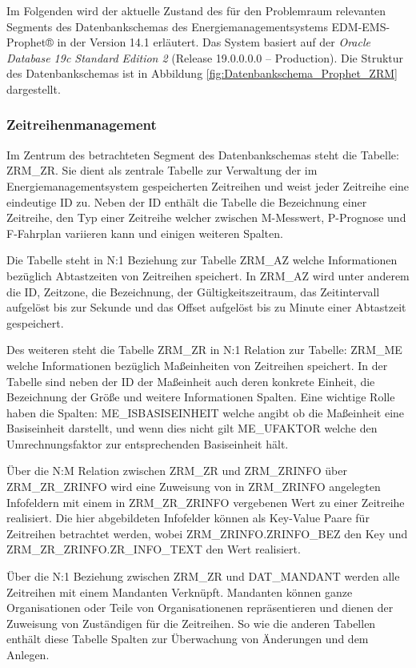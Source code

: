 Im Folgenden wird der aktuelle Zustand des für den Problemraum relevanten Segments des Datenbankschemas des Energiemanagementsystems EDM-EMS-Prophet® in der Version 14.1 erläutert.
Das System basiert auf der \textit{Oracle Database 19c Standard Edition 2} (Release 19.0.0.0.0 – Production). 
Die Struktur des Datenbankschemas ist in Abbildung \eqref{fig:Datenbankschema_Prophet_ZRM} dargestellt.

\subsubsection{Zeitreihenmanagement}
Im Zentrum des betrachteten Segment des Datenbankschemas steht die Tabelle: ZRM\_ZR. 
Sie dient als zentrale Tabelle zur Verwaltung der im Energiemanagementsystem gespeicherten Zeitreihen und weist jeder Zeitreihe eine eindeutige ID zu.
Neben der ID enthält die Tabelle die Bezeichnung einer Zeitreihe, den Typ einer Zeitreihe  welcher zwischen M-Messwert, P-Prognose 
und F-Fahrplan variieren kann und einigen weiteren Spalten.

Die Tabelle steht in N:1 Beziehung zur Tabelle ZRM\_AZ welche Informationen bezüglich Abtastzeiten von Zeitreihen speichert. 
In ZRM\_AZ wird unter anderem die ID, Zeitzone, die Bezeichnung, der Gültigkeitszeitraum, das Zeitintervall aufgelöst bis zur Sekunde und das 
Offset aufgelöst bis zu Minute einer Abtastzeit gespeichert.

Des weiteren steht die Tabelle ZRM\_ZR in N:1 Relation zur Tabelle: ZRM\_ME welche Informationen bezüglich Maßeinheiten von Zeitreihen speichert.
In der Tabelle sind neben der ID der Maßeinheit auch deren konkrete Einheit, die Bezeichnung der Größe und weitere Informationen Spalten. 
Eine wichtige Rolle haben die Spalten: ME\_ISBASISEINHEIT welche angibt ob die Maßeinheit eine Basiseinheit darstellt, und wenn dies nicht gilt 
ME\_UFAKTOR welche den Umrechnungsfaktor zur entsprechenden Basiseinheit hält.

Über die N:M Relation zwischen ZRM\_ZR und ZRM\_ZRINFO über ZRM\_ZR\_ZRINFO wird eine Zuweisung von in ZRM\_ZRINFO angelegten Infofeldern 
mit einem in ZRM\_ZR\_ZRINFO vergebenen Wert zu einer Zeitreihe realisiert. 
Die hier abgebildeten Infofelder können als Key-Value Paare für Zeitreihen betrachtet werden, wobei ZRM\_ZRINFO.ZRINFO\_BEZ den Key und 
ZRM\_ZR\_ZRINFO.ZR\_INFO\_TEXT den Wert realisiert.

Über die N:1 Beziehung zwischen ZRM\_ZR und DAT\_MANDANT werden alle Zeitreihen mit einem Mandanten Verknüpft. 
Mandanten können ganze Organisationen oder Teile von Organisationenen repräsentieren und dienen der Zuweisung von Zuständigen für die Zeitreihen. 
So wie die anderen Tabellen enthält diese Tabelle Spalten zur Überwachung von Änderungen und dem Anlegen.

